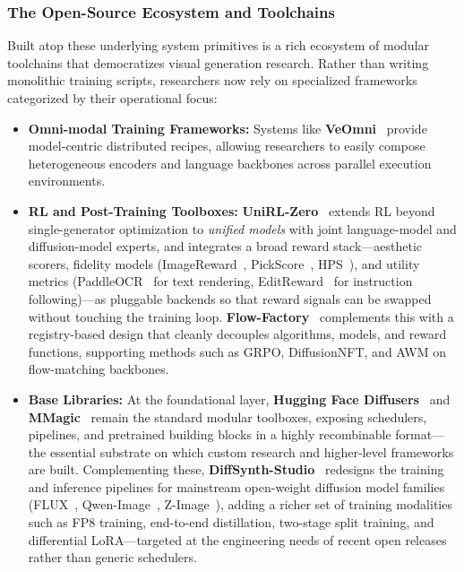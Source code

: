\subsubsection{The Open-Source Ecosystem and Toolchains}
\label{subsubsec:infra_ecosystem}
Built atop these underlying system primitives is a rich ecosystem of modular toolchains that democratizes visual generation research. Rather than writing monolithic training scripts, researchers now rely on specialized frameworks categorized by their operational focus:
\begin{itemize}
    \item \textbf{Omni-modal Training Frameworks:} Systems like \textbf{VeOmni}~\citep{ma2025veomni} provide model-centric distributed recipes, allowing researchers to easily compose heterogeneous encoders and language backbones across parallel execution environments.
    \item \textbf{RL and Post-Training Toolboxes:} \textbf{UniRL-Zero}~\citep{wang2025unirl} extends RL beyond single-generator optimization to \emph{unified models} with joint language-model and diffusion-model experts, and integrates a broad reward stack---aesthetic scorers, fidelity models (ImageReward~\citep{xu2023imagereward}, PickScore~\citep{kirstain2023pick}, HPS~\citep{wu2023human,ma2025hpsv3widespectrumhumanpreference}), and utility metrics (PaddleOCR~\citep{cui2025paddleocr30technicalreport} for text rendering, EditReward~\citep{wu2025editreward} for instruction following)---as pluggable backends so that reward signals can be swapped without touching the training loop. \textbf{Flow-Factory}~\citep{ping2026flowfactory} complements this with a registry-based design that cleanly decouples algorithms, models, and reward functions, supporting methods such as GRPO, DiffusionNFT, and AWM on flow-matching backbones.
    \item \textbf{Base Libraries:} At the foundational layer, \textbf{Hugging Face Diffusers}~\citep{von-platen-etal-2022-diffusers} and \textbf{MMagic}~\citep{mmagic2023} remain the standard modular toolboxes, exposing schedulers, pipelines, and pretrained building blocks in a highly recombinable format---the essential substrate on which custom research and higher-level frameworks are built. Complementing these, \textbf{DiffSynth-Studio}~\citep{diffsynth-studio} redesigns the training and inference pipelines for mainstream open-weight diffusion model families (FLUX~\citep{labs2025flux1kontextflowmatching}, Qwen-Image~\citep{wu2025qwen}, Z-Image~\citep{cai2025z}), adding a richer set of training modalities such as FP8 training, end-to-end distillation, two-stage split training, and differential LoRA---targeted at the engineering needs of recent open releases rather than generic schedulers.
\end{itemize}

